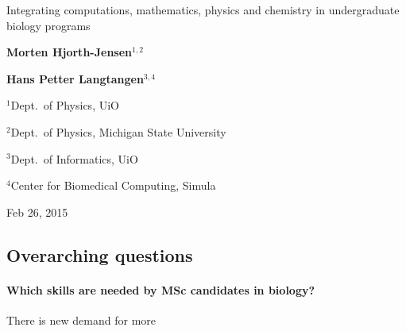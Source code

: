 \documentclass[%
twoside,                 %
final,                   %
10pt]{article}
\begin{document}




\thispagestyle{empty}

\begin{center}
{\LARGE\bf
\begin{spacing}{1.25}
Integrating computations, mathematics, physics and chemistry in undergraduate biology programs
\end{spacing}
}
\end{center}


\begin{center}
{\bf Morten Hjorth-Jensen${}^{1, 2}$} \\ [0mm]
\end{center}

    
\begin{center}
{\bf Hans Petter Langtangen${}^{3, 4}$} \\ [0mm]
\end{center}

    \begin{center}
\centerline{{\small ${}^1$Dept.~of Physics, UiO}}
\centerline{{\small ${}^2$Dept.~of Physics, Michigan State University}}
\centerline{{\small ${}^3$Dept.~of Informatics, UiO}}
\centerline{{\small ${}^4$Center for Biomedical Computing, Simula}}
\end{center}
    

\begin{center} %
Feb 26, 2015
\end{center}

\vspace{1cm}


\subsection*{Overarching questions}


\paragraph{Which skills are needed by MSc candidates in biology?}
There is new demand for more
\end{document}
